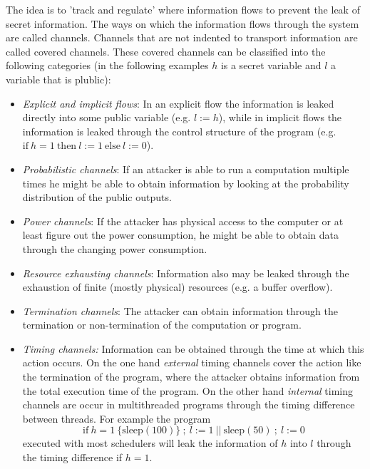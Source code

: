 \documentclass[a4paper,10pt]{llncs}
\begin{document}
The idea is to 'track and regulate' \cite{Zdancewic04} where information flows to
prevent the leak of secret information. The ways on which the information flows
through the system are called channels. Channels that are not indented to transport
information are called covered channels\cite{Sabelfeld03}. These covered channels can
be classified into the following categories (in the following examples $h$ is a secret
variable and $l$ a variable that is plublic):

\begin{itemize}
\item \textit{Explicit and implicit flows}: In an explicit flow the information is leaked
      directly into some public variable (e.g. $l := h$), while in implicit flows the information
      is leaked through the control structure of the program (e.g. $\text{if}\ h = 1\ \text{then}\ l := 1\ \text{else}\ l := 0$).
\item \textit{Probabilistic channels}: If an attacker is able to run a computation multiple times
      he might be able to obtain information by looking at the probability distribution of the
      public outputs.
\item \textit{Power channels}: If the attacker has physical access to the computer or at least figure out
      the power consumption, he might be able to obtain data through the changing power consumption.
\item \textit{Resource exhausting channels}: Information also may be leaked through the exhaustion
      of finite (mostly physical) resources (e.g. a buffer overflow).
\item \textit{Termination channels}: The attacker can obtain information through the termination
      or non-termination of the computation or program.
\item \textit{Timing channels:} Information can be obtained through the time at which this action
      occurs. On the one hand \textit{external} timing channels cover the action like the termination
      of the program, where the attacker obtains information from the total execution time of the program.
      On the other hand \textit{internal} timing channels are occur in multithreaded programs through the timing difference
      between threads. For example the program \[\text{if}\ h = 1\ \{\text{sleep}(100)\}\ ;\ l := 1\ ||\ \text{sleep}(50)\ ;\ l := 0\]
      executed with most schedulers will leak the information of $h$ into $l$ through the timing difference
      if $h = 1$.
\end{itemize}
\end{document}
